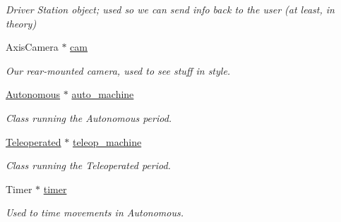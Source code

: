 \begin{DoxyCompactItemize}
\begin{DoxyCompactList}\small\item\em Driver Station object; used so we can send info back to the user (at least, in theory) \item\end{DoxyCompactList}\item 
\hypertarget{class_builtin_default_code_af2f3459e06aed9119e25fcdb359e1c2c}{
AxisCamera $\ast$ \hyperlink{class_builtin_default_code_af2f3459e06aed9119e25fcdb359e1c2c}{cam}}
\label{class_builtin_default_code_af2f3459e06aed9119e25fcdb359e1c2c}

\begin{DoxyCompactList}\small\item\em Our rear-\/mounted camera, used to see stuff in style. \item\end{DoxyCompactList}\item 
\hypertarget{class_builtin_default_code_ac9d108f12ceac87a203dbb17c73ed70b}{
\hyperlink{class_r_j_f_r_c2011_1_1_autonomous}{Autonomous} $\ast$ \hyperlink{class_builtin_default_code_ac9d108f12ceac87a203dbb17c73ed70b}{auto\_\-machine}}
\label{class_builtin_default_code_ac9d108f12ceac87a203dbb17c73ed70b}

\begin{DoxyCompactList}\small\item\em Class running the Autonomous period. \item\end{DoxyCompactList}\item 
\hypertarget{class_builtin_default_code_a9907b098362e4ec8b2d30e5a991b05b9}{
\hyperlink{class_r_j_f_r_c2011_1_1_teleoperated}{Teleoperated} $\ast$ \hyperlink{class_builtin_default_code_a9907b098362e4ec8b2d30e5a991b05b9}{teleop\_\-machine}}
\label{class_builtin_default_code_a9907b098362e4ec8b2d30e5a991b05b9}

\begin{DoxyCompactList}\small\item\em Class running the Teleoperated period. \item\end{DoxyCompactList}\item 
\hypertarget{class_builtin_default_code_ad59f2b60cccbf7bd6a43003017d1d01a}{
Timer $\ast$ \hyperlink{class_builtin_default_code_ad59f2b60cccbf7bd6a43003017d1d01a}{timer}}
\label{class_builtin_default_code_ad59f2b60cccbf7bd6a43003017d1d01a}

\begin{DoxyCompactList}\small\item\em Used to time movements in Autonomous. \item\end{DoxyCompactList}\end{DoxyCompactItemize}


